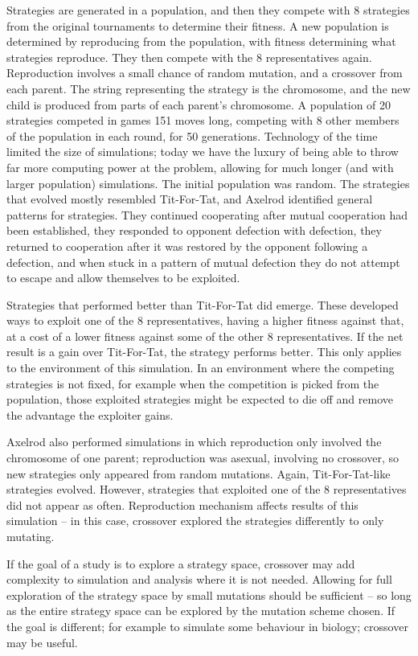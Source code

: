 \documentclass[a4paper,11pt,bcshonoursthesis,singlespace,oneside,thesisdraft,pdflatex]{cssethesis}
\begin{document}
Strategies are generated in a population, and then they compete with 8 strategies from the original tournaments to determine their fitness. A new population is determined by reproducing from the population, with fitness determining what strategies reproduce. They then compete with the 8 representatives again. 
Reproduction involves a small chance of random mutation, and a crossover from each parent. 
The string representing the strategy is the chromosome, and the new child is produced from parts of each parent's chromosome. A population of 20 strategies competed in games 151 moves long, competing with 8 other members of the population in each round, for 50 generations. 
Technology of the time limited the size of simulations; today we have the luxury of being able to throw far more computing power at the problem, allowing for much longer (and with larger population) simulations. 
The initial population was random. The strategies that evolved mostly resembled Tit-For-Tat, and Axelrod identified general patterns for strategies. They continued cooperating after mutual cooperation had been established, they responded to opponent defection with defection, they returned to cooperation after it was restored by the opponent following a defection, and when stuck in a pattern of mutual defection they do not attempt to escape and allow themselves to be exploited. 

Strategies that performed better than Tit-For-Tat did emerge. These developed ways to exploit one of the 8 representatives, having a higher fitness against that, at a cost of a lower fitness against some of the other 8 representatives. If the net result is a gain over Tit-For-Tat, the strategy performs better. 
This only applies to the environment of this simulation. 
In an environment where the competing strategies is not fixed, for example when the competition is picked from the population, those exploited strategies might be expected to die off and remove the advantage the exploiter gains. 

Axelrod also performed simulations in which reproduction only involved the chromosome of one parent; reproduction was asexual, involving no crossover, so new strategies only appeared from random mutations. 
Again, Tit-For-Tat-like strategies evolved. However, strategies that exploited one of the 8 representatives did not appear as often. Reproduction mechanism affects results of this simulation -- in this case, crossover explored the strategies differently to only mutating. 

If the goal of a study is to explore a strategy space, crossover may add complexity to simulation and analysis where it is not needed. Allowing for full exploration of the strategy space by small mutations should be sufficient -- so long as the entire strategy space can be explored by the mutation scheme chosen. 
If the goal is different; for example to simulate some behaviour in biology; crossover may be useful.
\end{document}
